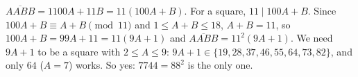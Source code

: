 $\overline{AABB}=1100A+11B=11(100A+B)$. For a square, $11\mid100A+B$. Since $100A+B\equiv A+B\pmod{11}$ and $1\le A+B\le18$, $A+B=11$, so $100A+B=99A+11=11(9A+1)$ and $\overline{AABB}=11^2(9A+1)$. We need $9A+1$ to be a square with $2\le A\le9$: $9A+1\in\{19,28,37,46,55,64,73,82\}$, and only $64$ ($A=7$) works. So yes: $\boxed{7744=88^2}$ is the only one.
